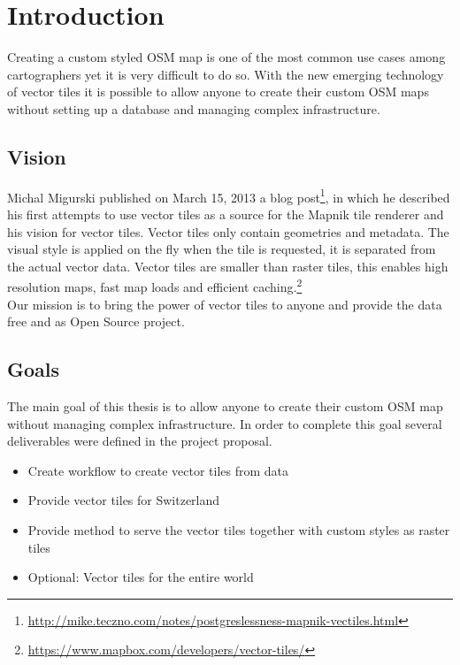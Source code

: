 \chapter{Introduction}


Creating a custom styled OSM map is one of the most common use cases
among cartographers yet it is very difficult to do so. With the new
emerging technology of vector tiles it is possible to allow anyone to
create their custom OSM maps without setting up a database and
managing complex infrastructure.


\section{Vision}\label{part1_vision}

Michal Migurski published on March 15, 2013 a blog
post\footnote{\url{http://mike.teczno.com/notes/postgreslessness-mapnik-vectiles.html}},
in which he described his first attempts to use vector tiles as a source
for the Mapnik tile renderer and his vision for vector tiles.
\newline{}
Vector tiles only contain geometries and metadata.
The visual style is applied on the fly when the tile is requested, it is separated from the
actual vector data. Vector tiles are smaller than raster tiles, this enables high resolution maps, fast map loads and efficient caching.\footnote{ \url{https://www.mapbox.com/developers/vector-tiles/}} \\
Our mission is to bring the power of vector tiles to anyone and provide
the data free and as Open Source project.


\section{Goals}\label{goals}

The main goal of this thesis is to allow anyone to create their custom
OSM map without managing complex infrastructure. In order to complete this goal
several deliverables were defined in the project proposal.

\begin{itemize}
\item
  Create workflow to create vector tiles from \osm{} data
\item
  Provide vector tiles for Switzerland
\item
  Provide method to serve the vector tiles together with
  custom styles as raster tiles
\item
  Optional: Vector tiles for the entire world
\end{itemize}